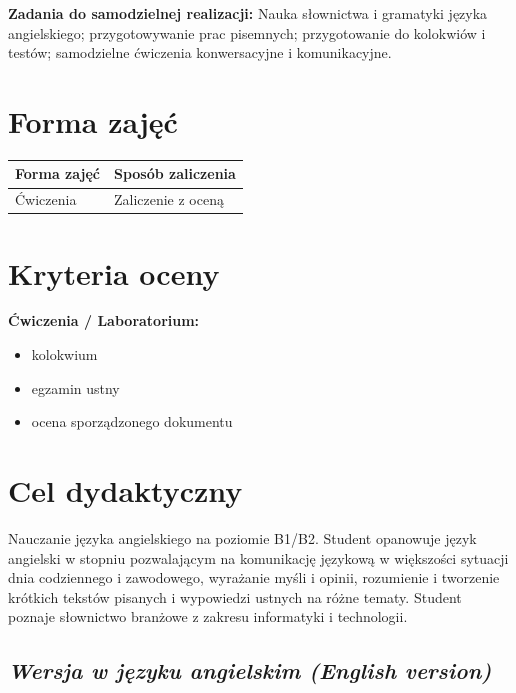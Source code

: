 \documentclass[12pt, a4paper]{article}
\newcommand{\thdrule}{\noalign{\global\setlength{\extrarowheight}{0pt}}}
\newcommand{\thdend}{\noalign{\global\setlength{\extrarowheight}{3pt}}}
\begin{document}
\vspace{4pt}
\noindent\textbf{Zadania do samodzielnej realizacji:} Nauka słownictwa i gramatyki języka angielskiego; przygotowywanie prac pisemnych; przygotowanie do kolokwiów i testów; samodzielne ćwiczenia konwersacyjne i komunikacyjne.

\section{Forma zajęć}

\begin{center}
{\scriptsize
\begin{tabular}{m{5cm}m{8cm}}
\thdrule\toprule
\rowcolor{pjatkRed} {\color{white}\textbf{Forma zajęć}} & {\color{white}\textbf{Sposób zaliczenia}} \\
\midrule\thdend
  \rowcolor{tableRowLight} Ćwiczenia & Zaliczenie z oceną \\
\bottomrule
\end{tabular}}
\end{center}

\section{Kryteria oceny}

\textbf{Ćwiczenia / Laboratorium:}
\begin{itemize}
  \item kolokwium
  \item egzamin ustny
  \item ocena sporządzonego dokumentu
\end{itemize}


\section{Cel dydaktyczny}

Nauczanie języka angielskiego na poziomie B1/B2. Student opanowuje język angielski w stopniu pozwalającym na komunikację językową w większości sytuacji dnia codziennego i zawodowego, wyrażanie myśli i opinii, rozumienie i tworzenie krótkich tekstów pisanych i wypowiedzi ustnych na różne tematy. Student poznaje słownictwo branżowe z zakresu informatyki i technologii.

\subsection*{\textit{Wersja w języku angielskim (English version)}}
\end{document}
